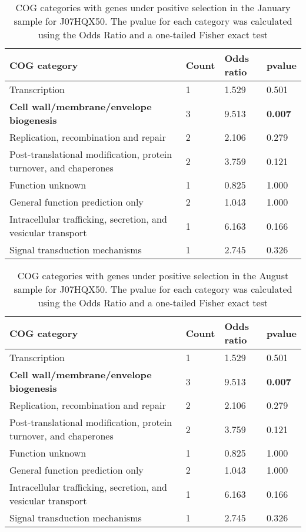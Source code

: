 \begin{table}[]
\footnotesize 
	\tabcolsep=0.11cm 
\caption{COG categories with genes under positive selection in the January sample for J07HQX50. The pvalue for each category was calculated using the Odds Ratio and a one-tailed Fisher exact test \\} 
\begin{tabularx}{\textwidth}{L{6cm}R{2cm}R{2cm}R{2cm}} 
\hline 
\textbf{COG category} & \textbf{Count} & \textbf{Odds ratio} & \textbf{pvalue} \\ 
\hline 
Transcription & 1 & 1.529 & 0.501 \\ 
\textbf{Cell wall/membrane/envelope biogenesis} & 3 & 9.513 & \textbf{0.007} \\ 
Replication, recombination and repair & 2 & 2.106 & 0.279 \\ 
Post-translational modification, protein turnover, and chaperones & 2 & 3.759 & 0.121 \\ 
Function unknown & 1 & 0.825 & 1.000 \\ 
General function prediction only & 2 & 1.043 & 1.000 \\ 
Intracellular trafficking, secretion, and vesicular transport & 1 & 6.163 & 0.166 \\ 
Signal transduction mechanisms & 1 & 2.745 & 0.326 \\ 
\end{tabularx} 
\label{January_COG_Selection_J07HQX50} 
 \end{table} 

\begin{table}[hb]
\footnotesize 
	\tabcolsep=0.11cm 
\caption{COG categories with genes under positive selection in the August sample for J07HQX50. The pvalue for each category was calculated using the Odds Ratio and a one-tailed Fisher exact test \\} 
\begin{tabularx}{\textwidth}{L{6cm}R{2cm}R{2cm}R{2cm}} 
\hline 
\textbf{COG category} & \textbf{Count} & \textbf{Odds ratio} & \textbf{pvalue} \\ 
\hline 
Transcription & 1 & 1.529 & 0.501 \\ 
\textbf{Cell wall/membrane/envelope biogenesis} & 3 & 9.513 & \textbf{0.007} \\ 
Replication, recombination and repair & 2 & 2.106 & 0.279 \\ 
Post-translational modification, protein turnover, and chaperones & 2 & 3.759 & 0.121 \\ 
Function unknown & 1 & 0.825 & 1.000 \\ 
General function prediction only & 2 & 1.043 & 1.000 \\ 
Intracellular trafficking, secretion, and vesicular transport & 1 & 6.163 & 0.166 \\ 
Signal transduction mechanisms & 1 & 2.745 & 0.326 \\ 
\end{tabularx} 
\label{August_COG_Selection_J07HQX50} 
 \end{table} 

